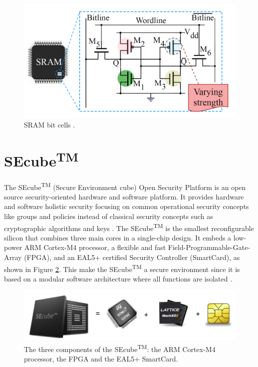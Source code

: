 \begin{figure}[h!]
\vspace{0.5cm}
\includegraphics[width=\textwidth]{images/SRAM_cell.png}
\caption{SRAM bit cells \cite{PUF_Sutar}. }
\label{fig:SRAM_cell} %
\end{figure}


\section{SEcube\textsuperscript{TM}}
The SEcube\textsuperscript{TM} (Secure Environment cube) Open Security Platform is an open source security-oriented hardware and software platform. It provides hardware and software holistic security focusing on common operational security concepts like groups and policies instead of classical security concepts such as cryptographic algorithms and keys \cite{SEcubeDoc}. The SEcube\textsuperscript{TM} is the smallest reconfigurable silicon that combines three main cores in a single-chip design. It embeds a low-power ARM Cortex-M4 processor, a flexible and fast Field-Programmable-Gate-Array (FPGA), and an EAL5+ certified Security Controller (SmartCard), as shown in Figure \ref{fig:SEcubeComponents}. This make the SEcube\textsuperscript{TM} a secure environment since it is based on a modular software architecture where all functions are isolated \cite{SEcubeSite}.

\begin{figure}[h!]
\vspace{0.5cm}
\includegraphics[width=\textwidth]{images/SEcubeComponents.png}
\caption{The three components of the SEcube\textsuperscript{TM}: the ARM Cortex-M4 processor, the FPGA and the EAL5+ SmartCard\cite{SEcubeDoc}. }
\label{fig:SEcubeComponents} %
\end{figure}





